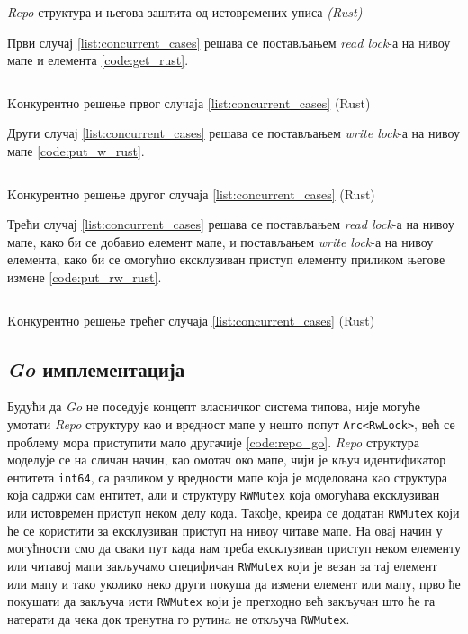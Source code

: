 \begin{listing}[H]
\inputminted{rust}{kodovi/rust_repo.rs}
\caption{\textit{Repo} структура и његова заштита од истовремених уписа  \textit{(Rust)}}
\label{code:rust_repo.rs}
\end{listing}

Први случај \ref{list:concurrent_cases} решава се постављањем \textit{read lock}-а на нивоу мапе и елемента \ref{code:get_rust}.\\

\begin{listing}[H]
\inputminted{rust}{kodovi/get.rs}
\caption{Kонкурентно решење првог случаја \ref{list:concurrent_cases} {(Rust)}}
\label{code:get_rust}
\end{listing}

Други случај \ref{list:concurrent_cases} решава се постављањем \textit{write lock}-а на нивоу мапе \ref{code:put_w_rust}.\\

\begin{listing}[H]
\inputminted{rust}{kodovi/put_w.rs}
\caption{Kонкурентно решење другог случаја \ref{list:concurrent_cases} {(Rust)}}
\label{code:put_w_rust}
\end{listing}

Трећи случај \ref{list:concurrent_cases} решава се постављањем \textit{read lock}-а на нивоу мапе, како би се добавио елемент мапе, и постављањем \textit{write lock}-а на нивоу елемента, како би се омогућио ексклузиван приступ елементу приликом његове измене \ref{code:put_rw_rust}.\\

\begin{listing}[H]
\inputminted{rust}{kodovi/put_rw.rs}
\caption{Kонкурентно решење трећег случаја \ref{list:concurrent_cases} {(Rust)}}
\label{code:put_rw_rust}
\end{listing}

\subsection{\textit{Go} имплементација}

Будући да \textit{Go} не поседује концепт власничког система типова, није могуће умотати \textit{Repo} структуру као и вредност мапе у нешто попут \texttt{Arc<RwLock>}, већ се проблему мора приступити мало другачије \ref{code:repo_go}. \textit{Repo} структура моделује се на сличан начин, као омотач око мапе, чији је кључ идентификатор ентитета \texttt{int64}, са разликом у вредности мапе која је моделована као структура која садржи сам ентитет, али и структуру \texttt{RWMutex} која омогућава ексклузиван или истовремен приступ неком делу кода. Такође, креира се додатан \texttt{RWMutex} који ће се користити за ексклузиван приступ на нивоу читаве мапе. На овај начин у могућности смо да сваки пут када нам треба ексклузиван приступ неком елементу или читавој мапи закључамо специфичан \texttt{RWMutex} који је везан за тај елемент или мапу и тако уколико неко други покуша да измени елемент или мапу, прво ће покушати да закључа исти \texttt{RWMutex} који је претходно већ закључан што ће га натерати да чека док тренутна го рутинa не откључа \texttt{RWMutex}. \\

